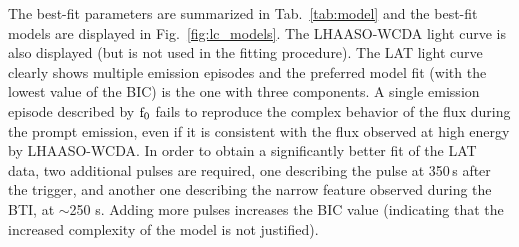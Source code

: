 \documentclass[preprint]{aastex631}
\begin{document}
The best-fit parameters are summarized in Tab.~\ref{tab:model} and the best-fit models are displayed in Fig.~\ref{fig:lc_models}. The LHAASO-WCDA light curve \citep{BOAT_LHAASO} is also displayed (but is not used in the fitting procedure). 
The LAT light curve clearly shows multiple emission episodes and the preferred model fit (with the lowest value of the BIC) is the one with three components. 
A single emission episode described by $\rm f_{0}$ fails to reproduce the complex behavior of the flux during the prompt emission, even if it is consistent with the flux observed at high energy by LHAASO-WCDA. In order to obtain a significantly better fit of the LAT data, two additional pulses are required, one describing the pulse at 350\,s after the trigger, and another one describing the narrow feature observed during the BTI, at $\sim$250 s. Adding more pulses increases the BIC value (indicating that the increased complexity of the model is not justified).
\end{document}
